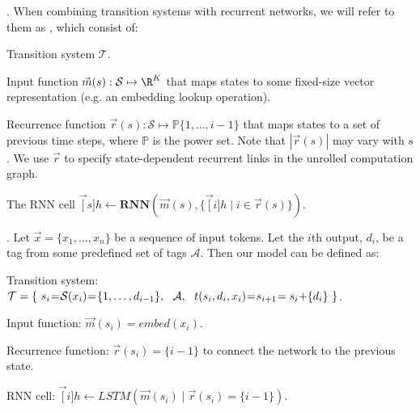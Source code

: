 \documentclass[11pt]{article}
\begin{document}
\myspace
\p {}. When combining transition systems with recurrent networks, we will refer to them as , which consist of:
\begin{compactitem}
	\item Transition system $\mathcal{T}$. 
	\item Input function $\vec{m}(s): \mathcal{S} \mapsto \R^K$ that maps states to some fixed-size vector representation (e.g. an embedding lookup operation). 
	\item Recurrence function $\vec{r}(s) : \mathcal{S} \mapsto \mathbb{P}\{ 1, \ldots, i - 1 \}$ that maps states to a set of previous time steps, where $\mathbb{P}$ is the power set. Note that $|\vec{r}(s)|$ may vary with $s$. We use $\vec{r}$ to specify state-dependent recurrent links in the unrolled computation graph. 
	\item The RNN cell $\vec[s]{h} \leftarrow \mathbf{RNN}(\vec{m}(s), \{ \vec[i]{h} \mid i \in \vec{r}(s) \})$. 
\end{compactitem}

\myspace
\p {}. Let $\vec{x} = \{ x_1, \ldots, x_n \}$ be a sequence of input tokens. Let the $i$th output, $d_i$, be a tag from some predefined set of tags $\mathcal{A}$. Then our model can be defined as:
\begin{compactitem}
	\item Transition system: $\mathcal{T} = \{~  s_i\hspace{-0.5ex}=\hspace{-0.5ex}\mathcal{S}(x_i)\hspace{-0.5ex}=\hspace{-0.5ex}\{1,\ldots,d_{i-1} \}, ~~ \mathcal{A}, ~~ t(s_i, d_i, x_i)\hspace{-0.5ex}=\hspace{-0.5ex}s_{i+1}\hspace{-0.5ex}=s_i\hspace{-0.5ex}+\hspace{-0.5ex}\{d_i\}  ~ \}$. 
	\item Input function:  $\vec{m}(s_i) = embed(x_i)$.
	\item Recurrence function: $\vec{r}(s_i) = \{i - 1\}$ to connect the network to the previous state. 
	\item RNN cell: $\vec[i]{h} \leftarrow LSTM(\vec{m}(s_i) \mid \vec{r}(s_i)=\{i-1\}  )$. 
\end{compactitem}
\end{document}
